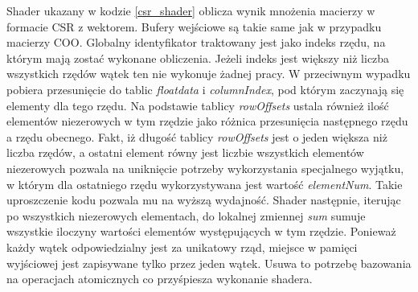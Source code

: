 Shader ukazany w kodzie \ref{csr_shader} oblicza wynik mnożenia macierzy w formacie CSR z wektorem.
Bufery wejściowe są takie same jak w przypadku macierzy COO.
Globalny identyfikator traktowany jest jako indeks rzędu, na którym mają zostać wykonane obliczenia.
Jeżeli indeks jest większy niż liczba wszystkich rzędów wątek ten nie wykonuje żadnej pracy.
W przeciwnym wypadku pobiera przesunięcie do tablic \textit{floatdata} i \textit{columnIndex}, pod którym zaczynają się elementy dla tego rzędu.
Na podstawie tablicy \textit{rowOffsets} ustala również ilość elementów niezerowych w tym rzędzie jako różnica przesunięcia następnego rzędu a rzędu obecnego.
Fakt, iż długość tablicy \textit{rowOffsets} jest o jeden większa niż liczba rzędów, a ostatni element równy jest liczbie wszystkich elementów niezerowych pozwala na uniknięcie potrzeby wykorzystania specjalnego wyjątku, w którym dla ostatniego rzędu wykorzystywana jest wartość \textit{elementNum}.
Takie uproszczenie kodu pozwala mu na wyższą wydajność.
Shader następnie, iterując po wszystkich niezerowych elementach, do lokalnej zmiennej \textit{sum} sumuje wszystkie iloczyny wartości elementów występujących w tym rzędzie.
Ponieważ każdy wątek odpowiedzialny jest za unikatowy rząd, miejsce w pamięci wyjściowej jest zapisywane tylko przez jeden wątek. 
Usuwa to potrzebę bazowania na operacjach atomicznych co przyśpiesza wykonanie shadera.


